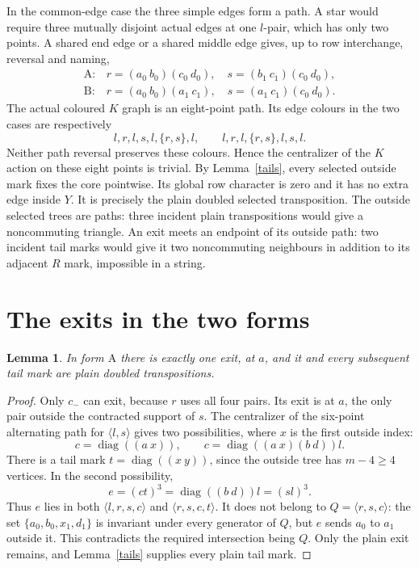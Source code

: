 \documentclass[11pt,a4paper]{article}
\newtheorem{lemma}{Lemma}
\newcommand{\gen}[1]{\langle#1\rangle}
\newcommand{\diag}{\operatorname{diag}}
\begin{document}
In the common-edge case the three simple edges form a path.
A star would require three mutually disjoint actual edges at
one $l$-pair, which has only two points. A shared end edge or
a shared middle edge gives, up to row interchange, reversal
and naming,
\[
\begin{array}{ll}
\mathrm A:&r=(a_0\ b_0)(c_0\ d_0),\quad
            s=(b_1\ c_1)(c_0\ d_0),\\[2pt]
\mathrm B:&r=(a_0\ b_0)(a_1\ c_1),\quad
            s=(a_1\ c_1)(c_0\ d_0).
\end{array}                                                   \tag{1}
\]
The actual coloured $K$ graph is an eight-point path. Its edge
colours in the two cases are respectively
\[
 l,r,l,s,l,\{r,s\},l,\qquad
 l,r,l,\{r,s\},l,s,l.
\]
Neither path reversal preserves these colours. Hence the
centralizer of the $K$ action on these eight points is trivial.
By Lemma~\ref{tails}, every selected outside mark fixes the core
pointwise. Its global row character is zero and it has no extra
edge inside $Y$. It is precisely the plain doubled selected
transposition. The outside selected trees are paths: three
incident plain transpositions would give a noncommuting triangle.
An exit meets an endpoint of its outside path: two incident tail
marks would give it two noncommuting neighbours in addition to
its adjacent $R$ mark, impossible in a string.

\section*{The exits in the two forms}
\begin{lemma}\label{Aexit}
In form $\mathrm A$ there is exactly one exit, at $a$, and
it and every subsequent tail mark are plain doubled transpositions.
\end{lemma}
\begin{proof}
Only $c_-$ can exit, because $r$ uses all four pairs. Its exit
is at $a$, the only pair outside the contracted support of $s$.
The centralizer of the six-point alternating path for
$\gen{l,s}$ gives two possibilities, where $x$ is the first
outside index:
\[
            c=\diag((a\ x)),\qquad
            c=\diag((a\ x)(b\ d))l.
\]
There is a tail mark $t=\diag((x\ y))$, since the outside
tree has $m-4\ge4$ vertices. In the second possibility,
\[
             e=(ct)^3=\diag((b\ d))l=(sl)^3.
\]
Thus $e$ lies in both $\gen{l,r,s,c}$ and $\gen{r,s,c,t}$.
It does not belong to $Q=\gen{r,s,c}$: the set
$\{a_0,b_0,x_1,d_1\}$ is invariant under every generator of
$Q$, but $e$ sends $a_0$ to $a_1$ outside it. This contradicts
the required intersection being $Q$. Only the plain exit remains,
and Lemma~\ref{tails} supplies every plain tail mark.
\end{proof}
\end{document}
